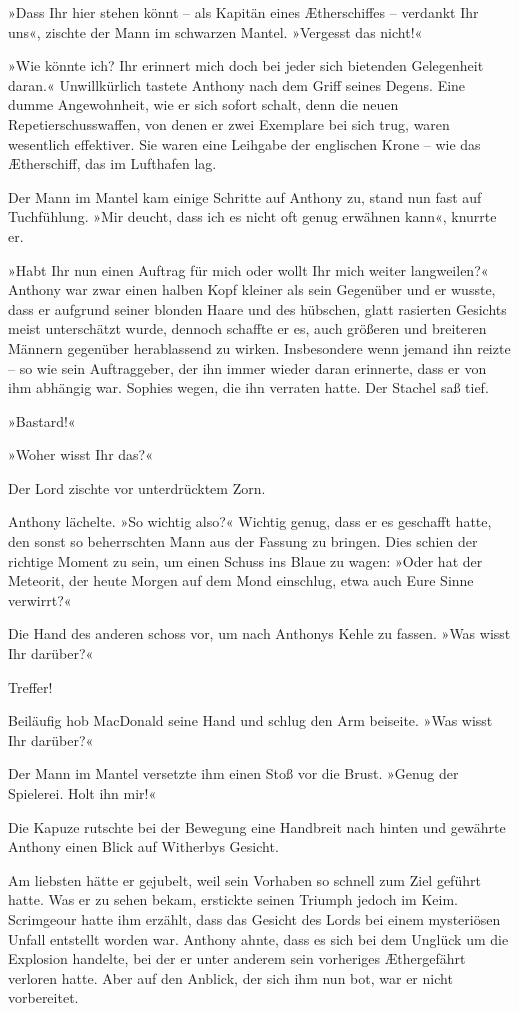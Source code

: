 »Dass Ihr hier stehen könnt – als Kapitän eines Ætherschiffes –
verdankt Ihr uns«, zischte der Mann im schwarzen Mantel. »Vergesst
das nicht!«

»Wie könnte ich? Ihr erinnert mich doch bei jeder sich bietenden
Gelegenheit daran.« Unwillkürlich tastete Anthony nach dem Griff
seines Degens. Eine dumme Angewohnheit, wie er sich sofort schalt,
denn die neuen Repetierschusswaffen, von denen er zwei Exemplare
bei sich trug, waren wesentlich effektiver. Sie waren eine Leihgabe
der englischen Krone – wie das Ætherschiff, das im Lufthafen lag.

Der Mann im Mantel kam einige Schritte auf Anthony zu, stand nun
fast auf Tuchfühlung. »Mir deucht, dass ich es nicht oft genug
erwähnen kann«, knurrte er.

»Habt Ihr nun einen Auftrag für mich oder wollt Ihr mich weiter
langweilen?« Anthony war zwar einen halben Kopf kleiner als sein
Gegenüber und er wusste, dass er aufgrund seiner blonden Haare und
des hübschen, glatt rasierten Gesichts meist unterschätzt wurde,
dennoch schaffte er es, auch größeren und breiteren Männern
gegenüber herablassend zu wirken. Insbesondere wenn jemand ihn
reizte – so wie sein Auftraggeber, der ihn immer wieder daran
erinnerte, dass er von ihm abhängig war. Sophies wegen, die ihn
verraten hatte. Der Stachel saß tief.

»Bastard!«

»Woher wisst Ihr das?«

Der Lord zischte vor unterdrücktem Zorn.

Anthony lächelte. »So wichtig also?« Wichtig genug, dass er es
geschafft hatte, den sonst so beherrschten Mann aus der Fassung zu
bringen. Dies schien der richtige Moment zu sein, um einen Schuss
ins Blaue zu wagen: »Oder hat der Meteorit, der heute Morgen auf
dem Mond einschlug, etwa auch Eure Sinne verwirrt?«

Die Hand des anderen schoss vor, um nach Anthonys Kehle zu fassen.
»Was wisst Ihr darüber?«

Treffer!

Beiläufig hob MacDonald seine Hand und schlug den Arm beiseite.
»Was wisst Ihr darüber?«

Der Mann im Mantel versetzte ihm einen Stoß vor die Brust. »Genug
der Spielerei. Holt ihn mir!«

Die Kapuze rutschte bei der Bewegung eine Handbreit nach hinten und
gewährte Anthony einen Blick auf Witherbys Gesicht.

Am liebsten hätte er gejubelt, weil sein Vorhaben so schnell zum
Ziel geführt hatte. Was er zu sehen bekam, erstickte seinen Triumph
jedoch im Keim. Scrimgeour hatte ihm erzählt, dass das Gesicht des
Lords bei einem mysteriösen Unfall entstellt worden war. Anthony
ahnte, dass es sich bei dem Unglück um die Explosion handelte, bei
der er unter anderem sein vorheriges Æthergefährt verloren hatte.
Aber auf den Anblick, der sich ihm nun bot, war er nicht
vorbereitet.

